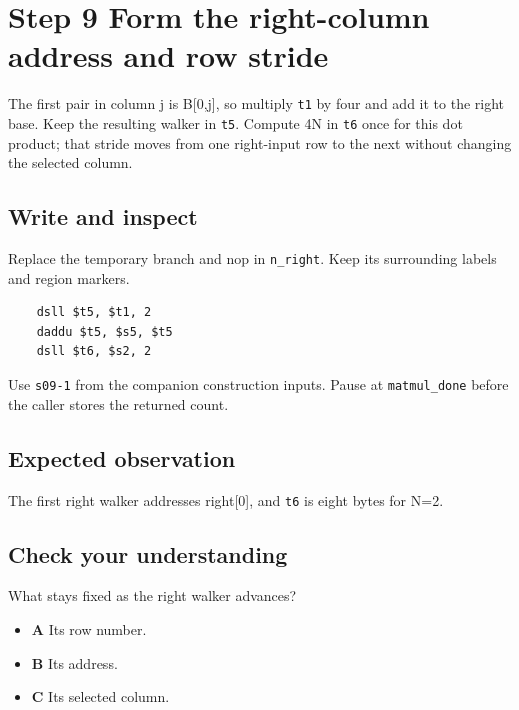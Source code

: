 \section{Step 9 Form the right-column address and row stride}\label{matmul-s09}

The first pair in column j is B[0,j], so multiply \texttt{t1} by four and add it to the right base. Keep the resulting walker in \texttt{t5}. Compute 4N in \texttt{t6} once for this dot product; that stride moves from one right-input row to the next without changing the selected column.

\subsection{Write and inspect}
Replace the temporary branch and nop in \texttt{n\_right}. Keep its surrounding labels and region markers.

\begin{verbatim}
    dsll $t5, $t1, 2
    daddu $t5, $s5, $t5
    dsll $t6, $s2, 2
\end{verbatim}
Use \texttt{s09-1} from the companion construction inputs. Pause at \texttt{matmul\_done} before the caller stores the returned count.

\subsection{Expected observation}
The first right walker addresses right[0], and \texttt{t6} is eight bytes for N=2.

\subsection{Check your understanding}
What stays fixed as the right walker advances?

\begin{itemize}
\item \textbf{A} Its row number.
\item \textbf{B} Its address.
\item \textbf{C} Its selected column.
\end{itemize}
